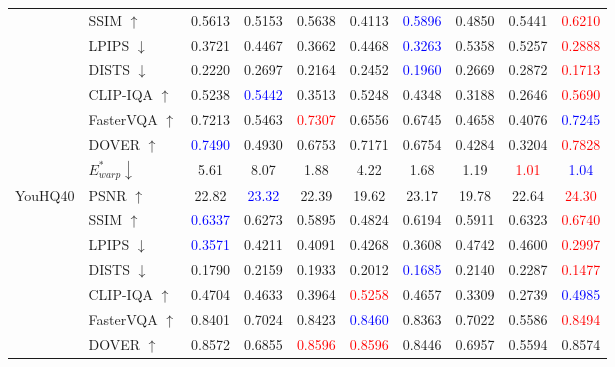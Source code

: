 \documentclass{article}
\begin{document}
\begin{table}[t]
{\begin{tabular}{l|l|c|c||c|c|c|c|c|c}
                & SSIM $\uparrow$         & 0.5613 & 0.5153 & 0.5638 & 0.4113 & \textcolor{blue}{0.5896} & 0.4850 & 0.5441 & \textcolor{red}{0.6210} \\
                & LPIPS $\downarrow$      & 0.3721 & 0.4467 & 0.3662 & 0.4468 & \textcolor{blue}{0.3263} & 0.5358 & 0.5257 & \textcolor{red}{0.2888} \\
                & DISTS $\downarrow$      & 0.2220 & 0.2697 & 0.2164 & 0.2452 & \textcolor{blue}{0.1960} & 0.2669 & 0.2872 & \textcolor{red}{0.1713} \\
                & CLIP-IQA $\uparrow$     & 0.5238 & \textcolor{blue}{0.5442} & 0.3513 & 0.5248 & 0.4348 & 0.3188 & 0.2646 & \textcolor{red}{0.5690} \\
                & FasterVQA $\uparrow$    & 0.7213 & 0.5463 & \textcolor{red}{0.7307} & 0.6556  & 0.6745 & 0.4658 & 0.4076 & \textcolor{blue}{0.7245 } \\
                & DOVER $\uparrow$        & \textcolor{blue}{0.7490} & 0.4930 & 0.6753 & 0.7171 & 0.6754 & 0.4284 & 0.3204 & \textcolor{red}{0.7828} \\
                & $E^*_{warp} \downarrow$ & 5.61   & 8.07   & 1.88   & 4.22   & 1.68   & 1.19   & \textcolor{red}{1.01} & \textcolor{blue}{1.04} \\
            \midrule
            \multirow{8}{*}{YouHQ40}
                & PSNR $\uparrow$         & 22.82 & \textcolor{blue}{23.32} & 22.39 & 19.62 & 23.17 & 19.78 & 22.64 & \textcolor{red}{24.30} \\
                & SSIM $\uparrow$         & \textcolor{blue}{0.6337} & 0.6273 & 0.5895 & 0.4824 & 0.6194 & 0.5911 & 0.6323 & \textcolor{red}{0.6740} \\
                & LPIPS $\downarrow$      & \textcolor{blue}{0.3571} & 0.4211 & 0.4091 & 0.4268 & 0.3608 & 0.4742 & 0.4600 & \textcolor{red}{0.2997} \\
                & DISTS $\downarrow$      & 0.1790 & 0.2159 & 0.1933 & 0.2012 & \textcolor{blue}{0.1685} & 0.2140 & 0.2287 & \textcolor{red}{0.1477} \\
                & CLIP-IQA $\uparrow$     & 0.4704 & 0.4633 & 0.3964 & \textcolor{red}{0.5258} & 0.4657 & 0.3309 & 0.2739 & \textcolor{blue}{0.4985} \\
                & FasterVQA $\uparrow$    & 0.8401 & 0.7024 & 0.8423 & \textcolor{blue}{0.8460} & 0.8363 & 0.7022 & 0.5586 & \textcolor{red}{0.8494} \\
                & DOVER $\uparrow$        & 0.8572 & 0.6855 & \textcolor{red}{0.8596} & \textcolor{red}{0.8596} & 0.8446 & 0.6957 & 0.5594 & 0.8574 \\

\end{tabular}}
\end{table}
\end{document}
